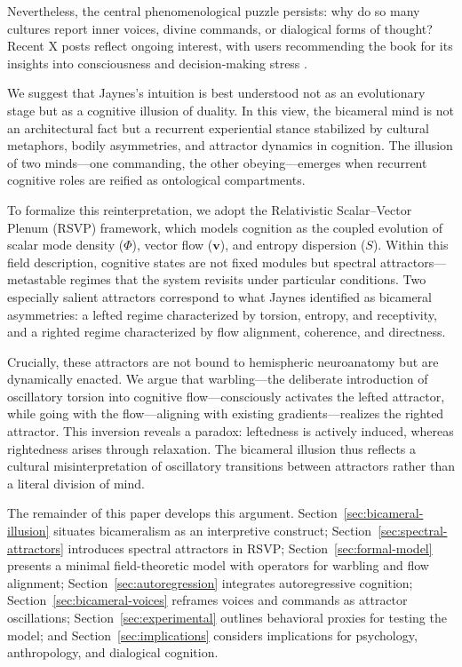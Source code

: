 \documentclass[a4paper,11pt]{article}
\begin{document}
Nevertheless, the central phenomenological puzzle persists: why do so many cultures report inner voices, divine commands, or dialogical forms of thought? Recent X posts reflect ongoing interest, with users recommending the book for its insights into consciousness and decision-making stress \citep{xpostbicameral1, xpostbicameral2}.

We suggest that Jaynes’s intuition is best understood not as an evolutionary stage but as a cognitive illusion of duality. In this view, the bicameral mind is not an architectural fact but a recurrent experiential stance stabilized by cultural metaphors, bodily asymmetries, and attractor dynamics in cognition. The illusion of two minds—one commanding, the other obeying—emerges when recurrent cognitive roles are reified as ontological compartments.

To formalize this reinterpretation, we adopt the Relativistic Scalar--Vector Plenum (RSVP) framework, which models cognition as the coupled evolution of scalar mode density ($\Phi$), vector flow ($\mathbf{v}$), and entropy dispersion ($S$). Within this field description, cognitive states are not fixed modules but spectral attractors—metastable regimes that the system revisits under particular conditions. Two especially salient attractors correspond to what Jaynes identified as bicameral asymmetries: a lefted regime characterized by torsion, entropy, and receptivity, and a righted regime characterized by flow alignment, coherence, and directness.

Crucially, these attractors are not bound to hemispheric neuroanatomy but are dynamically enacted. We argue that warbling—the deliberate introduction of oscillatory torsion into cognitive flow—consciously activates the lefted attractor, while going with the flow—aligning with existing gradients—realizes the righted attractor. This inversion reveals a paradox: leftedness is actively induced, whereas rightedness arises through relaxation. The bicameral illusion thus reflects a cultural misinterpretation of oscillatory transitions between attractors rather than a literal division of mind.

The remainder of this paper develops this argument. Section~\ref{sec:bicameral-illusion} situates bicameralism as an interpretive construct; Section~\ref{sec:spectral-attractors} introduces spectral attractors in RSVP; Section~\ref{sec:formal-model} presents a minimal field-theoretic model with operators for warbling and flow alignment; Section~\ref{sec:autoregression} integrates autoregressive cognition; Section~\ref{sec:bicameral-voices} reframes voices and commands as attractor oscillations; Section~\ref{sec:experimental} outlines behavioral proxies for testing the model; and Section~\ref{sec:implications} considers implications for psychology, anthropology, and dialogical cognition.
\end{document}
